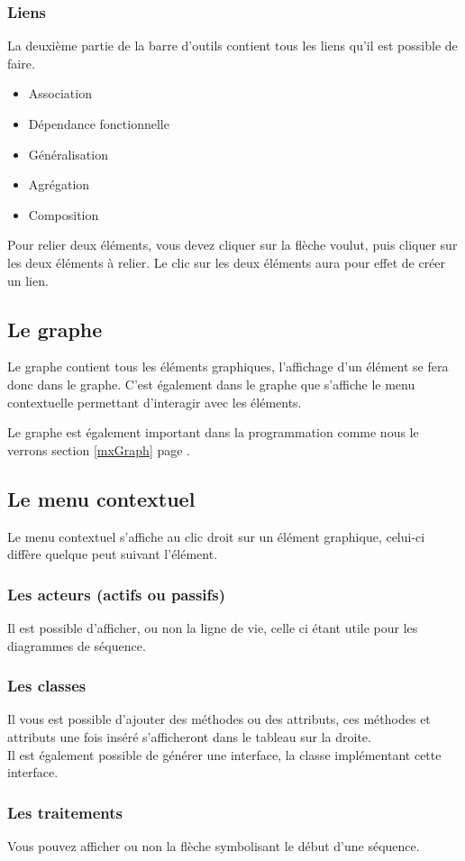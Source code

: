 \documentclass[12pt,a4paper,oneside]{book}
\begin{document}
	\subsubsection{Liens}
	La deuxième partie de la barre d'outils contient tous les liens qu'il est possible de faire.
	\begin{itemize}
		\item Association
		\item Dépendance fonctionnelle
		\item Généralisation
		\item Agrégation
		\item Composition
	\end{itemize}
		Pour relier deux éléments, vous devez cliquer sur la flèche voulut, puis cliquer sur les deux éléments à relier. 
	Le clic sur les deux éléments aura pour effet de créer un lien.
	\subsection{Le graphe}
	Le graphe contient tous les éléments graphiques, l'affichage d'un élément se fera donc dans le graphe. 
	C'est également dans le graphe que s'affiche le menu contextuelle permettant d'interagir avec les éléments.

	Le graphe est également important dans la programmation comme nous le verrons section \ref{mxGraph} page \pageref{mxGraph}.

	\subsection{Le menu contextuel}
	Le menu contextuel s'affiche au clic droit sur un élément graphique, celui-ci diffère quelque peut suivant l'élément. 
		\subsubsection{Les acteurs (actifs ou passifs)}
		Il est possible d'afficher, ou non la ligne de vie, celle ci étant utile pour les diagrammes de séquence.
		\subsubsection{Les classes}
		Il vous est possible d'ajouter des méthodes ou des attributs, ces méthodes et attributs une fois inséré s'afficheront dans le tableau sur la droite.\\
		Il est également possible de générer une interface, la classe implémentant cette interface.
		\subsubsection{Les traitements}
		Vous pouvez afficher ou non la flèche symbolisant le début d'une séquence.
\end{document}
